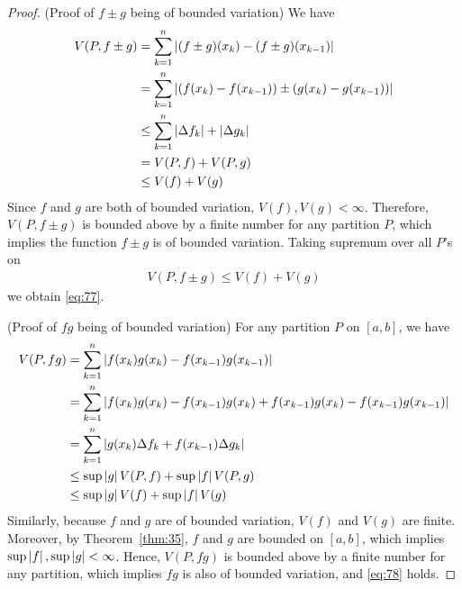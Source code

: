 \documentclass[thmcnt=section, 12pt]{my-elegantbook}
\begin{document}
\begin{proof}
    (Proof of $f \pm g$ being of bounded variation) We have 
    \begin{align*}
        V(P, f \pm g)
        &= \sum_{k=1}^n \left\lvert (f \pm g)(x_k) - (f \pm g)(x_{k-1}) \right\rvert \\ 
        &= \sum_{k=1}^n \left\lvert ( f(x_k) - f(x_{k-1}) ) \pm ( g(x_k) - g(x_{k-1}) ) \right\rvert \\ 
        &\leq \sum_{k=1}^n \left\lvert \Delta f_k \right\rvert + \left\lvert \Delta g_k \right\rvert \\ 
        &= V(P, f) + V(P, g) \\ 
        &\leq V(f) + V(g)
    \end{align*}
    Since $f$ and $g$ are both of bounded variation, $V(f), V(g) < \infty$. Therefore, $V(P, f \pm g)$ is bounded above by a finite number for any partition $P$, which implies the function $f \pm g$ is of bounded variation. Taking supremum over all $P$'s on 
    \begin{align*}
        V(P, f \pm g) \leq V(f) + V(g)
    \end{align*}
    we obtain \eqref{eq:77}.
    
    \par (Proof of $f g$ being of bounded variation) For any partition $P$ on $[a, b]$, we have 
    \begin{align*}
        V(P, f g)
        &= \sum_{k=1}^n \left\lvert f(x_k) g(x_k) - f(x_{k-1}) g(x_{k-1}) \right\rvert \\ 
        &= \sum_{k=1}^n \left\lvert 
            f(x_k) g(x_k) 
            - f(x_{k-1}) g(x_k) 
            + f(x_{k-1}) g(x_k) 
            - f(x_{k-1}) g(x_{k-1})
         \right\rvert \\  
        &= \sum_{k=1}^n \left\lvert 
            g(x_k) \Delta f_k
            + f(x_{k-1}) \Delta g_k
         \right\rvert \\ 
        &\leq \sup\left\lvert g \right\rvert V(P, f) + \sup\left\lvert f \right\rvert V(P, g) \\ 
        &\leq \sup\left\lvert g \right\rvert V(f) + \sup\left\lvert f \right\rvert V(g)
    \end{align*}
    Similarly, because $f$ and $g$ are of bounded variation, $V(f)$ and $V(g)$ are finite. Moreover, by Theorem~\ref{thm:35}, $f$ and $g$ are bounded on $[a, b]$, which implies $\sup\left\lvert f \right\rvert, \sup\left\lvert g \right\rvert < \infty$. Hence, $V(P, f g)$ is bounded above by a finite number for any partition, which implies $fg$ is also of bounded variation, and \eqref{eq:78} holds.
\end{proof}

\end{document}
